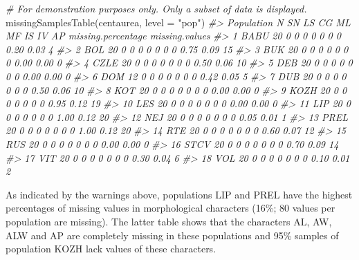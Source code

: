 \documentclass[
  11pt,
  a4paper]{article}
\newenvironment{Shaded}{\begin{snugshade}}{\end{snugshade}}
\newcommand{\AttributeTok}[1]{\textcolor[rgb]{0.77,0.63,0.00}{#1}}
\newcommand{\CommentTok}[1]{\textcolor[rgb]{0.56,0.35,0.01}{\textit{#1}}}
\newcommand{\FunctionTok}[1]{\textcolor[rgb]{0.00,0.00,0.00}{#1}}
\newcommand{\NormalTok}[1]{#1}
\newcommand{\StringTok}[1]{\textcolor[rgb]{0.31,0.60,0.02}{#1}}
\begin{document}
\begin{Shaded}
\begin{Highlighting}[]
\CommentTok{\# For demonstration purposes only. Only a subset of data is displayed.}
\FunctionTok{missingSamplesTable}\NormalTok{(centaurea, }\AttributeTok{level =} \StringTok{"pop"}\NormalTok{)}
\CommentTok{\#\textgreater{}    Population  N SN LS CG ML MF IS IV   AP missing.percentage missing.values}
\CommentTok{\#\textgreater{} 1        BABU 20  0  0  0  0  0  0  0 0.20               0.03              4}
\CommentTok{\#\textgreater{} 2         BOL 20  0  0  0  0  0  0  0 0.75               0.09             15}
\CommentTok{\#\textgreater{} 3         BUK 20  0  0  0  0  0  0  0 0.00               0.00              0}
\CommentTok{\#\textgreater{} 4        CZLE 20  0  0  0  0  0  0  0 0.50               0.06             10}
\CommentTok{\#\textgreater{} 5         DEB 20  0  0  0  0  0  0  0 0.00               0.00              0}
\CommentTok{\#\textgreater{} 6         DOM 12  0  0  0  0  0  0  0 0.42               0.05              5}
\CommentTok{\#\textgreater{} 7         DUB 20  0  0  0  0  0  0  0 0.50               0.06             10}
\CommentTok{\#\textgreater{} 8         KOT 20  0  0  0  0  0  0  0 0.00               0.00              0}
\CommentTok{\#\textgreater{} 9        KOZH 20  0  0  0  0  0  0  0 0.95               0.12             19}
\CommentTok{\#\textgreater{} 10        LES 20  0  0  0  0  0  0  0 0.00               0.00              0}
\CommentTok{\#\textgreater{} 11        LIP 20  0  0  0  0  0  0  0 1.00               0.12             20}
\CommentTok{\#\textgreater{} 12        NEJ 20  0  0  0  0  0  0  0 0.05               0.01              1}
\CommentTok{\#\textgreater{} 13       PREL 20  0  0  0  0  0  0  0 1.00               0.12             20}
\CommentTok{\#\textgreater{} 14        RTE 20  0  0  0  0  0  0  0 0.60               0.07             12}
\CommentTok{\#\textgreater{} 15        RUS 20  0  0  0  0  0  0  0 0.00               0.00              0}
\CommentTok{\#\textgreater{} 16       STCV 20  0  0  0  0  0  0  0 0.70               0.09             14}
\CommentTok{\#\textgreater{} 17        VIT 20  0  0  0  0  0  0  0 0.30               0.04              6}
\CommentTok{\#\textgreater{} 18        VOL 20  0  0  0  0  0  0  0 0.10               0.01              2}
\end{Highlighting}
\end{Shaded}

As indicated by the warnings above, populations LIP and PREL have the
highest percentages of missing values in morphological characters (16\%;
80 values per population are missing). The latter table shows that the
characters AL, AW, ALW and AP are completely missing in these
populations and 95\% samples of population KOZH lack values of these
characters.
\end{document}
